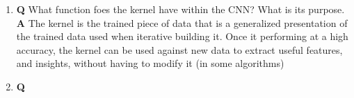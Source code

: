 \documentclass[main.tex]{subfiles}
\begin{document}
\begin{enumerate}
	\begin{enumerate}
	    \item \textbf{Q} What function foes the kernel have within the CNN? What is its purpose. \textbf{A} The kernel is the trained piece of data that is a generalized presentation of the trained data used when iterative building it. Once it performing at a high accuracy, the kernel can be used against new data to extract useful features, and insights, without having to modify it (in some algorithms)
	    \item \textbf{Q} 
 	\end{enumerate}
	
\end{enumerate}

\end{document}
